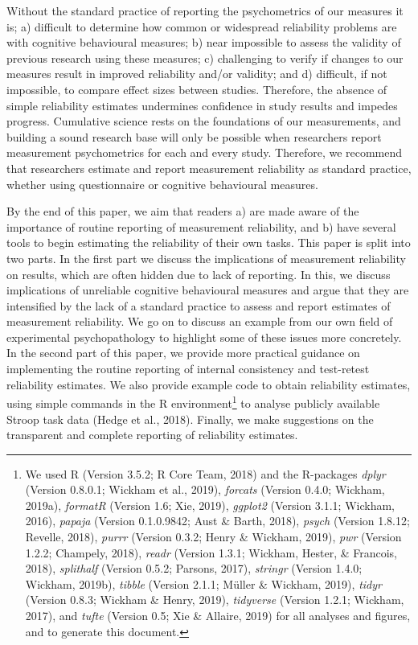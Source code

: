 \documentclass[english,,man,floatsintext]{apa6}
\let\rmarkdownfootnote\footnote%
\def\footnote{\protect\rmarkdownfootnote}
\begin{document}
Without the standard practice of reporting the psychometrics of our measures it is; a) difficult to determine how common or widespread reliability problems are with cognitive behavioural measures; b) near impossible to assess the validity of previous research using these measures; c) challenging to verify if changes to our measures result in improved reliability and/or validity; and d) difficult, if not impossible, to compare effect sizes between studies. Therefore, the absence of simple reliability estimates undermines confidence in study results and impedes progress. Cumulative science rests on the foundations of our measurements, and building a sound research base will only be possible when researchers report measurement psychometrics for each and every study. Therefore, we recommend that researchers estimate and report measurement reliability as standard practice, whether using questionnaire or cognitive behavioural measures.

By the end of this paper, we aim that readers a) are made aware of the importance of routine reporting of measurement reliability, and b) have several tools to begin estimating the reliability of their own tasks. This paper is split into two parts. In the first part we discuss the implications of measurement reliability on results, which are often hidden due to lack of reporting. In this, we discuss implications of unreliable cognitive behavioural measures and argue that they are intensified by the lack of a standard practice to assess and report estimates of measurement reliability. We go on to discuss an example from our own field of experimental psychopathology to highlight some of these issues more concretely. In the second part of this paper, we provide more practical guidance on implementing the routine reporting of internal consistency and test-retest reliability estimates. We also provide example code to obtain reliability estimates, using simple commands in the R environment\footnote{We used R (Version 3.5.2; R Core Team, 2018) and the R-packages \emph{dplyr} (Version 0.8.0.1; Wickham et al., 2019), \emph{forcats} (Version 0.4.0; Wickham, 2019a), \emph{formatR} (Version 1.6; Xie, 2019), \emph{ggplot2} (Version 3.1.1; Wickham, 2016), \emph{papaja} (Version 0.1.0.9842; Aust \& Barth, 2018), \emph{psych} (Version 1.8.12; Revelle, 2018), \emph{purrr} (Version 0.3.2; Henry \& Wickham, 2019), \emph{pwr} (Version 1.2.2; Champely, 2018), \emph{readr} (Version 1.3.1; Wickham, Hester, \& Francois, 2018), \emph{splithalf} (Version 0.5.2; Parsons, 2017), \emph{stringr} (Version 1.4.0; Wickham, 2019b), \emph{tibble} (Version 2.1.1; Müller \& Wickham, 2019), \emph{tidyr} (Version 0.8.3; Wickham \& Henry, 2019), \emph{tidyverse} (Version 1.2.1; Wickham, 2017), and \emph{tufte} (Version 0.5; Xie \& Allaire, 2019) for all analyses and figures, and to generate this document.} to analyse publicly available Stroop task data (Hedge et al., 2018). Finally, we make suggestions on the transparent and complete reporting of reliability estimates.
\end{document}
